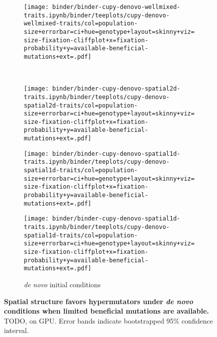 \begin{figure}[h]
\begin{minipage}{\textwidth}
    \begin{subfigure}[b]{\linewidth}
        \begin{minipage}{0.3\textwidth}
          \texttt{[image: binder/binder-cupy-denovo-wellmixed-traits.ipynb/binder/teeplots/cupy-denovo-wellmixed-traits/col=population-size+errorbar=ci+hue=genotype+layout=skinny+viz=size-fixation-cliffplot+x=fixation-probability+y=available-beneficial-mutations+ext=.pdf]}%
        \end{minipage}%
        \begin{minipage}{0.06\textwidth}
          ~
        \end{minipage}%
        \begin{minipage}{0.26\textwidth}
          \texttt{[image: binder/binder-cupy-denovo-spatial2d-traits.ipynb/binder/teeplots/cupy-denovo-spatial2d-traits/col=population-size+errorbar=ci+hue=genotype+layout=skinny+viz=size-fixation-cliffplot+x=fixation-probability+y=available-beneficial-mutations+ext=.pdf]}%
        \end{minipage}%
        \begin{minipage}{0.25\textwidth}
          \texttt{[image: binder/binder-cupy-denovo-spatial1d-traits.ipynb/binder/teeplots/cupy-denovo-spatial1d-traits/col=population-size+errorbar=ci+hue=genotype+layout=skinny+viz=size-fixation-cliffplot+x=fixation-probability+y=available-beneficial-mutations+ext=.pdf]}%
        \end{minipage}%
      \begin{minipage}{0.12\textwidth}
        \raggedright
        \large
        \vspace{10ex}
        \caption{\textit{de novo} initial conditions}
        \label{fig:spatial-structure:denovo}

        \texttt{[image: binder/binder-cupy-denovo-spatial1d-traits.ipynb/binder/teeplots/cupy-denovo-spatial1d-traits/col=population-size+errorbar=ci+hue=genotype+layout=skinny+viz=size-fixation-cliffplot+x=fixation-probability+y=available-beneficial-mutations+ext=.pdf]}%
      \end{minipage}%
    \end{subfigure}%

  \end{minipage}

  \vspace{-10ex}

  \begin{minipage}{\textwidth}
    \caption{%
      \textbf{Spatial structure favors hypermutators under \textit{de novo} conditions when limited beneficial mutations are available.}
      \footnotesize
      TODO, on GPU.
      Error bands indicate bootstrapped 95\% confidence interval.
    }
    \label{fig:spatial-structure}
  \end{minipage}
\end{figure}
